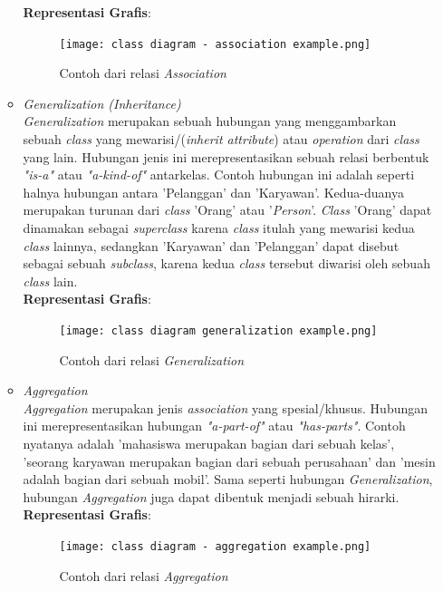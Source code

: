 \documentclass[a4paper]{article}
\begin{document}
\begin{enumerate}
\begin{itemize}
        \textbf{Representasi Grafis}:\\
        \begin{figure}[h]
            \centering
            \texttt{[image: class diagram - association example.png]}
            \caption{Contoh dari relasi \textit{Association}}
        \end{figure}
        \item \textit{Generalization (Inheritance)}\\
        \textit{Generalization} merupakan sebuah hubungan yang menggambarkan sebuah \textit{class} yang mewarisi/(\textit{inherit attribute}) atau \textit{operation} dari \textit{class} yang lain\autocite{what-is-class-diagram}. Hubungan jenis ini merepresentasikan sebuah relasi berbentuk \textit{"is-a"} atau \textit{"a-kind-of"} antarkelas. Contoh hubungan ini adalah seperti halnya hubungan antara 'Pelanggan' dan 'Karyawan'. Kedua-duanya merupakan turunan dari \textit{class} 'Orang' atau '\textit{Person}'. \textit{Class} 'Orang' dapat dinamakan sebagai \textit{superclass} karena \textit{class} itulah yang mewarisi kedua \textit{class} lainnya, sedangkan 'Karyawan' dan 'Pelanggan' dapat disebut sebagai sebuah \textit{subclass}, karena kedua \textit{class} tersebut diwarisi oleh sebuah \textit{class} lain\autocite{systemanalysisdesign-class-diagram-relations}.\\
        \textbf{Representasi Grafis}:\\
        \begin{figure}[h]
            \centering
            \texttt{[image: class diagram generalization example.png]}
            \caption{Contoh dari relasi \textit{Generalization}}
        \end{figure}
        \item \textit{Aggregation}\\
        \textit{Aggregation} merupakan jenis \textit{association} yang spesial/khusus. Hubungan ini merepresentasikan hubungan \textit{"a-part-of"} atau \textit{"has-parts"}. Contoh nyatanya adalah 'mahasiswa merupakan bagian dari sebuah kelas', 'seorang karyawan merupakan bagian dari sebuah perusahaan' dan 'mesin adalah bagian dari sebuah mobil'. Sama seperti hubungan \textit{Generalization}, hubungan \textit{Aggregation} juga dapat dibentuk menjadi sebuah hirarki\autocite{systemanalysisdesign-class-diagram-relations}.\\
        \textbf{Representasi Grafis}:\\
        \begin{figure}[h]
            \centering
            \texttt{[image: class diagram - aggregation example.png]}
            \caption{Contoh dari relasi \textit{Aggregation}}
        \end{figure}


\end{itemize}
\end{enumerate}
\end{document}
